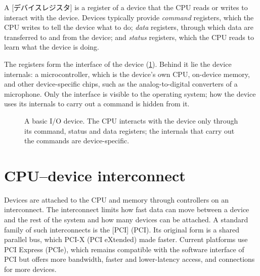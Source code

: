 \documentclass[../main.tex]{subfiles}
\begin{document}
\begin{definition}
  A [デバイスレジスタ] is a register of a device that
  the CPU reads or writes to interact with the device.  Devices typically
  provide \emph{command} registers, which the CPU writes to tell the device
  what to do; \emph{data} registers, through which data are transferred to
  and from the device; and \emph{status} registers, which the CPU reads to
  learn what the device is doing.
\end{definition}

The registers form the interface of the device (\cref{fig:l11-device}).%
Behind it lie the device internals: a microcontroller, which is the device's
own CPU, on-device memory, and other device-specific chips, such as the
analog-to-digital converters of a microphone.  Only the interface is
visible to the operating system; how the device uses its internals to carry
out a command is hidden from it.

\begin{figure}[htbp]
  \centering
  
  \caption{A basic I/O device.  The CPU interacts with the device only
    through its command, status and data registers; the internals that carry
    out the commands are device-specific.}
  \label{fig:l11-device}
\end{figure}

\section{CPU--device interconnect}
\label{sec:l11-interconnect}

Devices are attached to the CPU and memory through controllers on an
interconnect.  The interconnect limits how fast data can
move between a device and the rest of the system and how many devices can
be attached.  A standard family of such interconnects is the
[PCI]%
 (PCI).  Its original form
is a shared parallel bus, which PCI-X (PCI eXtended) made faster.  Current
platforms use PCI Express (PCIe), which remains compatible with the software
interface of PCI but offers more bandwidth, faster and lower-latency access,
and connections for more devices.
\end{document}
